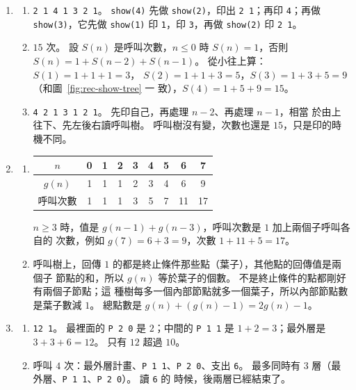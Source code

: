 \begin{enumerate}
\item
\begin{enumerate}
\item \texttt{2 1 4 1 3 2 1}。 \texttt{show(4)} 先做 \texttt{show(2)}，印出
\texttt{2 1}；再印 \texttt{4}；再做 \texttt{show(3)}，它先做 \texttt{show(1)}
印 \texttt{1}，印 \texttt{3}，再做 \texttt{show(2)} 印 \texttt{2 1}。
\item $15$ 次。 設 $S(n)$ 是呼叫次數，$n \le 0$ 時 $S(n) = 1$，否則
$S(n) = 1 + S(n - 2) + S(n - 1)$。 從小往上算：$S(1) = 1 + 1 + 1 = 3$，
$S(2) = 1 + 1 + 3 = 5$，$S(3) = 1 + 3 + 5 = 9$（和圖~\ref{fig:rec-show-tree} 一
致），$S(4) = 1 + 5 + 9 = 15$。
\item \texttt{4 2 1 3 1 2 1}。 先印自己，再處理 $n - 2$、再處理 $n - 1$，相當
於由上往下、先左後右讀呼叫樹。 呼叫樹沒有變，次數也還是 $15$，只是印的時機不同。
\end{enumerate}

\item
\begin{enumerate}
\item
\begin{center}
\begin{tabular}{ccccccccc}
\toprule
$n$ & 0 & 1 & 2 & 3 & 4 & 5 & 6 & 7 \\
\midrule
$g(n)$ & 1 & 1 & 1 & 2 & 3 & 4 & 6 & 9 \\
呼叫次數 & 1 & 1 & 1 & 3 & 5 & 7 & 11 & 17 \\
\bottomrule
\end{tabular}
\end{center}
$n \ge 3$ 時，值是 $g(n - 1) + g(n - 3)$，呼叫次數是 $1$ 加上兩個子呼叫各自的
次數，例如 $g(7) = 6 + 3 = 9$，次數 $1 + 11 + 5 = 17$。
\item 呼叫樹上，回傳 $1$ 的都是終止條件那些點（葉子），其他點的回傳值是兩個子
節點的和，所以 $g(n)$ 等於葉子的個數。 不是終止條件的點都剛好有兩個子節點；這
種樹每多一個內部節點就多一個葉子，所以內部節點數是葉子數減 $1$。 總點數是
$g(n) + (g(n) - 1) = 2g(n) - 1$。
\end{enumerate}

\item
\begin{enumerate}
\item \texttt{12 1}。 最裡面的 \texttt{P 2 0} 是 $2$；中間的 \texttt{P 1 1} 是
$1 + 2 = 3$；最外層是 $3 + 3 + 6 = 12$。 只有 $12$ 超過 $10$。
\item 呼叫 $4$ 次：最外層計畫、\texttt{P 1 1}、\texttt{P 2 0}、支出 \texttt{6}。
最多同時有 $3$ 層（最外層、\texttt{P 1 1}、\texttt{P 2 0}）。 讀 \texttt{6} 的
時候，後兩層已經結束了。
\end{enumerate}


\end{enumerate}
